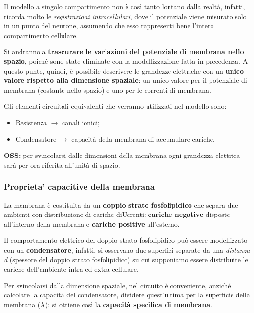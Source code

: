 \documentclass[12pt,a4paper,openany]{book}
\begin{document}
Il modello a singolo compartimento non è così tanto lontano dalla realtà, infatti, ricorda molto le \textit{registrazioni intracellulari}, dove il potenziale viene misurato solo in un punto del neurone, assumendo che esso rappresenti bene l'intero compartimento cellulare.

Si andranno a \textbf{trascurare le variazioni del potenziale di membrana nello spazio}, poiché sono state eliminate con la modellizzazione fatta in precedenza. A questo punto, quindi, è possibile descrivere le grandezze elettriche con un \textbf{unico valore rispetto alla dimensione spaziale}: un unico valore per il potenziale di membrana (costante nello spazio) e uno per le correnti di membrana.

Gli elementi circuitali equivalenti che verranno utilizzati nel modello sono:

\begin{itemize}
  \item Resistenza $\rightarrow$ canali ionici;
  \item Condensatore $\rightarrow$ capacità della membrana di accumulare cariche.
\end{itemize}
\textbf{OSS: }per svincolarsi dalle dimensioni della membrana ogni grandezza elettrica sarà per ora riferita all'unità di spazio.

\subsubsection{Proprieta' capacitive della membrana}

La membrana è costituita da un \textbf{doppio strato fosfolipidico }che separa due ambienti con distribuzione di cariche diUerenti: \textbf{cariche negative }disposte all'interno della membrana e \textbf{cariche positive }all'esterno.

Il comportamento elettrico del doppio strato fosfolipidico può essere modellizzato con un \textbf{condensatore}, infatti, si osservano due superfici separate da una \textit{distanza d }(spessore del doppio strato fosfolipidico) su cui supponiamo essere distribuite le cariche dell'ambiente intra ed extra-cellulare.

Per svincolarsi dalla dimensione spaziale, nel circuito è conveniente, anziché calcolare la capacità del condensatore, dividere quest'ultima per la superficie della membrana (A): si ottiene così la \textbf{capacità specifica di membrana}.

\end{document}
